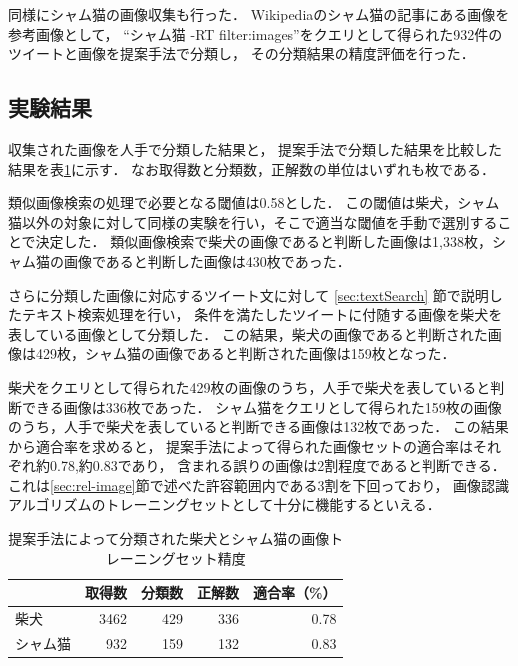 \documentclass{deimj}
\begin{document}
同様にシャム猫の画像収集も行った．
Wikipediaのシャム猫の記事にある画像を参考画像として，
“シャム猫 -RT filter:images”をクエリとして得られた932件のツイートと画像を提案手法で分類し，
その分類結果の精度評価を行った．

\subsection{実験結果}
\label{sec:expresult}

収集された画像を人手で分類した結果と，
提案手法で分類した結果を比較した
結果を表\ref{tab:result-shiba}に示す．
なお取得数と分類数，正解数の単位はいずれも枚である．

類似画像検索の処理で必要となる閾値は0.58とした．
この閾値は柴犬，シャム猫以外の対象に対して同様の実験を行い，そこで適当な閾値を手動で選別することで決定した．
類似画像検索で柴犬の画像であると判断した画像は1,338枚，シャム猫の画像であると判断した画像は430枚であった．

さらに分類した画像に対応するツイート文に対して
\ref{sec:textSearch}
節で説明したテキスト検索処理を行い，
条件を満たしたツイートに付随する画像を柴犬を表している画像として分類した．
この結果，柴犬の画像であると判断された画像は429枚，シャム猫の画像であると判断された画像は159枚となった．


柴犬をクエリとして得られた429枚の画像のうち，人手で柴犬を表していると判断できる画像は336枚であった．
シャム猫をクエリとして得られた159枚の画像のうち，人手で柴犬を表していると判断できる画像は132枚であった．
この結果から適合率を求めると，
提案手法によって得られた画像セットの適合率はそれぞれ約0.78,約0.83であり，
含まれる誤りの画像は2割程度であると判断できる．
これは\ref{sec:rel-image}節で述べた許容範囲内である3割を下回っており，
画像認識アルゴリズムのトレーニングセットとして十分に機能するといえる．

\begin{table}[tb]
\begin{center}
\caption{提案手法によって分類された柴犬とシャム猫の画像トレーニングセット精度}
\label{tab:result-shiba}
\begin{tabular}{|l|r|r|r|r|}\hline
& 取得数& 分類数& 正解数& 適合率（\%） \\ \hline \hline

柴犬& 3462& 429& 336& 0.78 \\ \hline
シャム猫& 932& 159& 132& 0.83 \\ \hline
\end{tabular}
\end{center}
\end{table}
\end{document}

